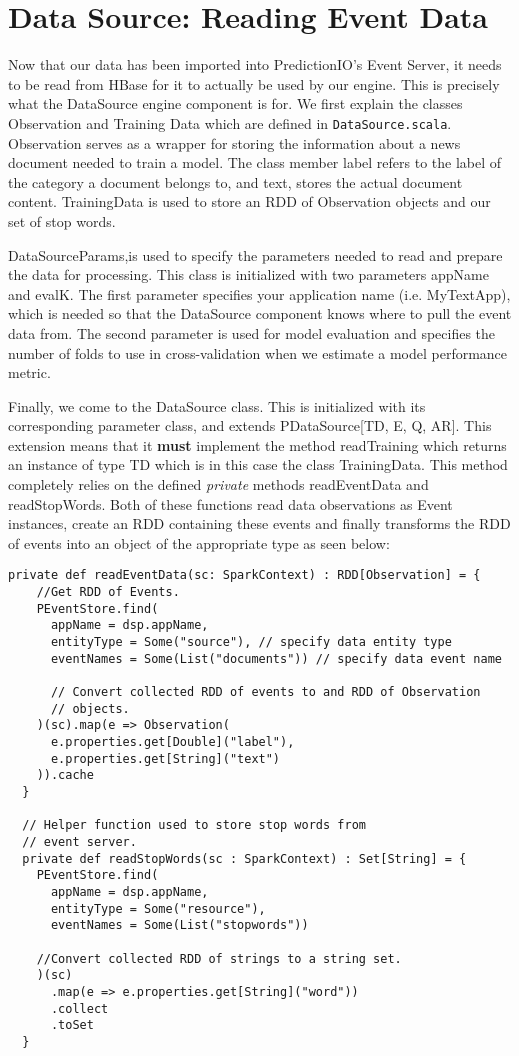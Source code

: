 \documentclass[a4paper,12pt]{article}
\renewcommand{\bf}[1]{\textbf{#1}}
\renewcommand{\it}[1]{\textit{#1}}
\renewcommand{\tt}[1]{\texttt{#1}}
\newcommand{\3}{\left}
\newcommand{\4}{\right}
\renewcommand{\-}[1]{{}^{-#1}}
\begin{document}
\section*{Data Source: Reading Event Data}

Now that our data has been imported into PredictionIO's Event Server, it needs to be read from HBase for it to actually be used by our engine. This is precisely what the DataSource engine component is for. We first explain the classes Observation and Training Data which are defined in \tt{DataSource.scala}. Observation serves as a wrapper for storing the information about a news document needed to train a model. The class member label refers to the label of the category a document belongs to, and text, stores the actual document content. TrainingData is used to store an RDD of Observation objects and our set of stop words. 

DataSourceParams,is used to specify the parameters needed to read and prepare the data for processing. This class is initialized with two parameters appName and evalK. The first parameter specifies your application name (i.e. MyTextApp), which is needed so that the DataSource component knows where to pull the event data from. The second parameter is used for model evaluation and specifies the number of folds to use in cross-validation 
when we estimate a model performance metric.

Finally, we come to the DataSource class. This is initialized with its corresponding parameter class, and extends PDataSource[TD, E, Q, AR]. This extension means that it \bf{must} implement the method readTraining which returns an instance of type TD which is in this case the class TrainingData. This method completely relies on the defined \it{private} methods readEventData and readStopWords. Both of these functions read data observations as Event instances, create an RDD containing these events and finally transforms the RDD of events into an object of the appropriate type as seen below:

\begin{verbatim}
private def readEventData(sc: SparkContext) : RDD[Observation] = {
    //Get RDD of Events.
    PEventStore.find(
      appName = dsp.appName,
      entityType = Some("source"), // specify data entity type
      eventNames = Some(List("documents")) // specify data event name

      // Convert collected RDD of events to and RDD of Observation
      // objects.
    )(sc).map(e => Observation(
      e.properties.get[Double]("label"),
      e.properties.get[String]("text")
    )).cache
  }

  // Helper function used to store stop words from
  // event server.
  private def readStopWords(sc : SparkContext) : Set[String] = {
    PEventStore.find(
      appName = dsp.appName,
      entityType = Some("resource"),
      eventNames = Some(List("stopwords"))

    //Convert collected RDD of strings to a string set.
    )(sc)
      .map(e => e.properties.get[String]("word"))
      .collect
      .toSet
  }
\end{verbatim}
\end{document}

